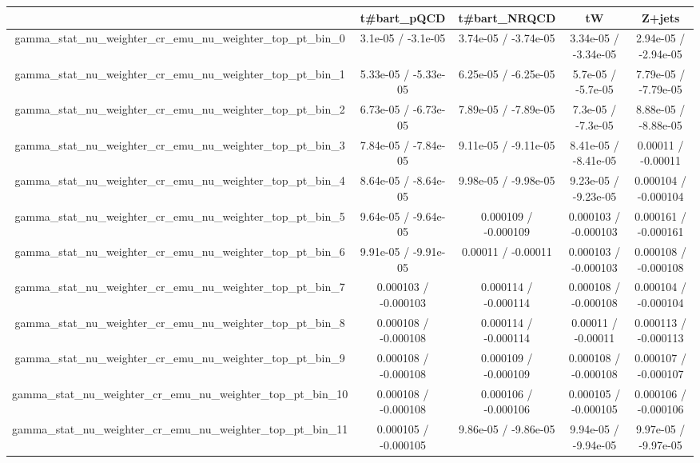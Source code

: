 \documentclass[10pt]{article}
\begin{document}
\begin{table}[htbp]
\begin{center}
\begin{tabular}{|c|c|c|c|c|}
\hline 
      & t#bar{t}_{pQCD}      & t#bar{t}_{NRQCD}      & tW      & Z+jets \\ 
\hline 
  gamma_stat_nu_weighter_cr_emu_nu_weighter_top_pt_bin_0 & 3.1e-05 / -3.1e-05 & 3.74e-05 / -3.74e-05 & 3.34e-05 / -3.34e-05 & 2.94e-05 / -2.94e-05 \\ 
  gamma_stat_nu_weighter_cr_emu_nu_weighter_top_pt_bin_1 & 5.33e-05 / -5.33e-05 & 6.25e-05 / -6.25e-05 & 5.7e-05 / -5.7e-05 & 7.79e-05 / -7.79e-05 \\ 
  gamma_stat_nu_weighter_cr_emu_nu_weighter_top_pt_bin_2 & 6.73e-05 / -6.73e-05 & 7.89e-05 / -7.89e-05 & 7.3e-05 / -7.3e-05 & 8.88e-05 / -8.88e-05 \\ 
  gamma_stat_nu_weighter_cr_emu_nu_weighter_top_pt_bin_3 & 7.84e-05 / -7.84e-05 & 9.11e-05 / -9.11e-05 & 8.41e-05 / -8.41e-05 & 0.00011 / -0.00011 \\ 
  gamma_stat_nu_weighter_cr_emu_nu_weighter_top_pt_bin_4 & 8.64e-05 / -8.64e-05 & 9.98e-05 / -9.98e-05 & 9.23e-05 / -9.23e-05 & 0.000104 / -0.000104 \\ 
  gamma_stat_nu_weighter_cr_emu_nu_weighter_top_pt_bin_5 & 9.64e-05 / -9.64e-05 & 0.000109 / -0.000109 & 0.000103 / -0.000103 & 0.000161 / -0.000161 \\ 
  gamma_stat_nu_weighter_cr_emu_nu_weighter_top_pt_bin_6 & 9.91e-05 / -9.91e-05 & 0.00011 / -0.00011 & 0.000103 / -0.000103 & 0.000108 / -0.000108 \\ 
  gamma_stat_nu_weighter_cr_emu_nu_weighter_top_pt_bin_7 & 0.000103 / -0.000103 & 0.000114 / -0.000114 & 0.000108 / -0.000108 & 0.000104 / -0.000104 \\ 
  gamma_stat_nu_weighter_cr_emu_nu_weighter_top_pt_bin_8 & 0.000108 / -0.000108 & 0.000114 / -0.000114 & 0.00011 / -0.00011 & 0.000113 / -0.000113 \\ 
  gamma_stat_nu_weighter_cr_emu_nu_weighter_top_pt_bin_9 & 0.000108 / -0.000108 & 0.000109 / -0.000109 & 0.000108 / -0.000108 & 0.000107 / -0.000107 \\ 
  gamma_stat_nu_weighter_cr_emu_nu_weighter_top_pt_bin_10 & 0.000108 / -0.000108 & 0.000106 / -0.000106 & 0.000105 / -0.000105 & 0.000106 / -0.000106 \\ 
  gamma_stat_nu_weighter_cr_emu_nu_weighter_top_pt_bin_11 & 0.000105 / -0.000105 & 9.86e-05 / -9.86e-05 & 9.94e-05 / -9.94e-05 & 9.97e-05 / -9.97e-05 \\ 

\end{tabular}
\end{center}
\end{table}
\end{document}
